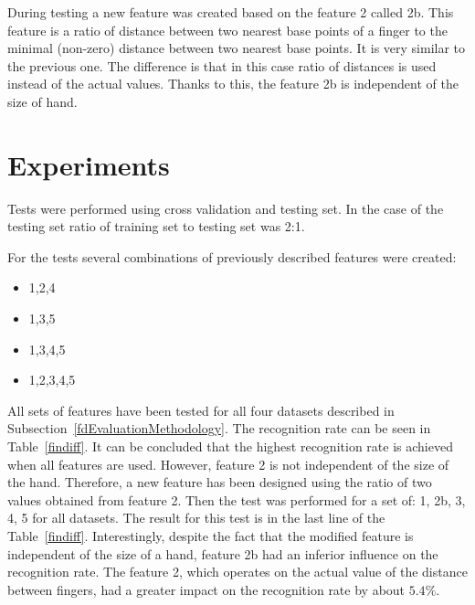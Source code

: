 During testing a new feature was created based on the feature 2 called 2b. This feature is a ratio of distance between two nearest base points of a finger to the minimal (non-zero) distance between two nearest base points. It is very similar to the previous one. The difference is that in this case ratio of distances is used instead of the actual values. Thanks to this, the feature 2b is independent of the size of hand.

\section{Experiments}
Tests were performed using cross validation and testing set. In the case of the testing set ratio of training set to testing set was 2:1.

For the tests several combinations of previously described features were created:
\begin{itemize}
\item 1,2,4
\item 1,3,5
\item 1,3,4,5
\item 1,2,3,4,5
\end{itemize}

All sets of features have been tested for all four datasets described in Subsection~\ref{fdEvaluationMethodology}. The recognition rate can be seen in Table~\ref{findiff}. It can be concluded that the highest recognition rate is achieved when all features are used. However, feature 2 is not independent of the size of the hand. Therefore, a new feature has been designed using the ratio of two values obtained from feature 2. Then the test was performed for a set of: 1, 2b, 3, 4, 5 for all datasets. The result for this test is in the last line of the Table~\ref{findiff}. Interestingly, despite the fact that the modified feature is independent of the size of a hand, feature 2b had an inferior influence on the recognition rate. The feature 2, which operates on the actual value of the distance between fingers, had a greater impact on the recognition rate by about $5.4\%$. 

